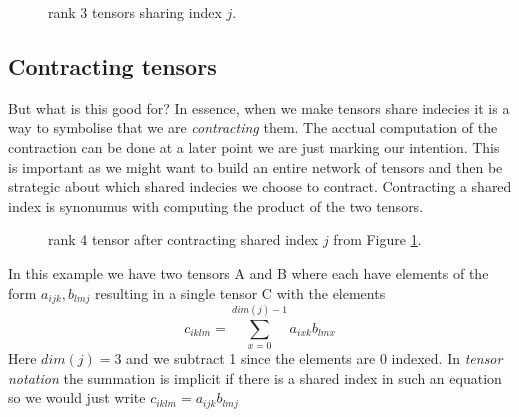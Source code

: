 \begin{figure}[H]
    \centering 
    \caption{rank 3 tensors sharing index $j$.}
    \label{fig:2r3t}
\end{figure}
\subsection{Contracting tensors }
\noindent
But what is this good for? In essence, when we make tensors share indecies it is a way to symbolise that we are \textit{contracting} them. The acctual computation of the contraction can be done at a later point we are just marking our intention. This is important as we might want to build an entire network of tensors and then be strategic about which shared indecies we choose to contract. Contracting a shared index is synonumus with computing the product of the two tensors. 
\begin{figure}[H]
    \centering 
    \caption{rank 4 tensor after contracting shared index $j$ from Figure \ref{fig:2r3t}.}
    \label{fig:4t}
\end{figure}
\noindent
In this example we have two tensors A and B where each have elements of the form $a_{ijk}, b_{lmj}$ resulting in a single tensor C with the elements $$c_{iklm}=\displaystyle\sum_{x=0}^{dim(j)-1} a_{ixk}b_{lmx} $$
Here $dim(j)=3$ and we subtract 1 since the elements are 0 indexed. In \textit{tensor notation} the summation is implicit if there is a shared index in such an equation so we would just write $c_{iklm}=a_{ijk}b_{lmj}$

